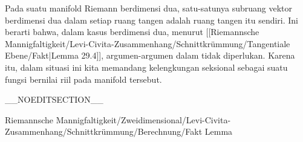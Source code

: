 {}
{

Pada suatu manifold Riemann berdimensi dua, satu-satunya subruang vektor berdimensi dua dalam setiap ruang tangen adalah ruang tangen itu sendiri. Ini berarti bahwa, dalam kasus berdimensi dua, menurut
[[Riemannsche Mannigfaltigkeit/Levi-Civita-Zusammenhang/Schnittkrümmung/Tangentiale Ebene/Fakt|Lemma 29.4]],
argumen-argumen dalam
tidak diperlukan. Karena itu, dalam situasi ini kita memandang kelengkungan seksional sebagai suatu fungsi bernilai riil pada manifold tersebut.

}

__NOEDITSECTION__

{Riemannsche Mannigfaltigkeit/Zweidimensional/Levi-Civita-Zusammenhang/Schnittkrümmung/Berechnung/Fakt}
{Lemma}
{}
{

\faktzusatz {}
\faktzusatz {}

}
